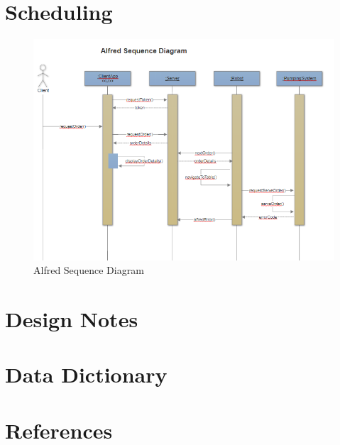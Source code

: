 \documentclass [10pt]{article}
\begin{document}
\section {Scheduling}
\begin{figure} [h!]
	\centering
	\includegraphics [scale = 0.4] {figures/Alfred_SequenceDiagram.png}
	\caption{Alfred Sequence Diagram}
\end{figure}
\section {Design Notes}

\section {Data Dictionary}

\section {References}
\end{document}
